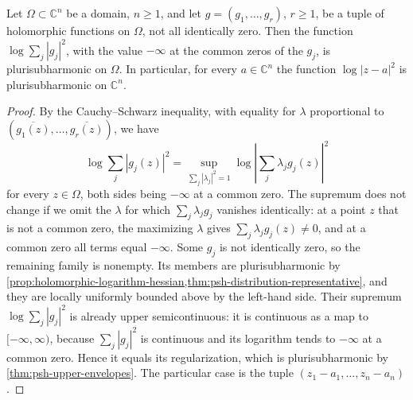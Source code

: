 \begin{proposition}\label{prop:holomorphic-tuple-logarithm}
Let $\Omega\subset\mathbb{C}^n$ be a domain, $n\geq1$, and let $g=(g_1,\ldots,g_r)$, $r\geq1$, be a tuple of holomorphic functions on $\Omega$, not all identically zero. Then the function $\log\sum_j|g_j|^2$, with the value $-\infty$ at the common zeros of the $g_j$, is plurisubharmonic on $\Omega$. In particular, for every $a\in\mathbb{C}^n$ the function $\log|z-a|^2$ is plurisubharmonic on $\mathbb{C}^n$.
\end{proposition}
\begin{proof}
By the Cauchy--Schwarz inequality, with equality for $\lambda$ proportional to $(\overline{g_1(z)},\ldots,\overline{g_r(z)})$, we have
\[
 \log\sum_j|g_j(z)|^2
       =\sup_{\sum_j|\lambda_j|^2=1}\log\left|\sum_j\lambda_jg_j(z)\right|^2
\]
for every $z\in\Omega$, both sides being $-\infty$ at a common zero. The supremum does not change if we omit the $\lambda$ for which $\sum_j\lambda_jg_j$ vanishes identically: at a point $z$ that is not a common zero, the maximizing $\lambda$ gives $\sum_j\lambda_jg_j(z)\neq0$, and at a common zero all terms equal $-\infty$. Some $g_j$ is not identically zero, so the remaining family is nonempty. Its members are plurisubharmonic by \cref{prop:holomorphic-logarithm-hessian,thm:psh-distribution-representative}, and they are locally uniformly bounded above by the left-hand side. Their supremum $\log\sum_j|g_j|^2$ is already upper semicontinuous: it is continuous as a map to $[-\infty,\infty)$, because $\sum_j|g_j|^2$ is continuous and its logarithm tends to $-\infty$ at a common zero. Hence it equals its regularization, which is plurisubharmonic by \cref{thm:psh-upper-envelopes}. The particular case is the tuple $(z_1-a_1,\ldots,z_n-a_n)$.
\end{proof}

